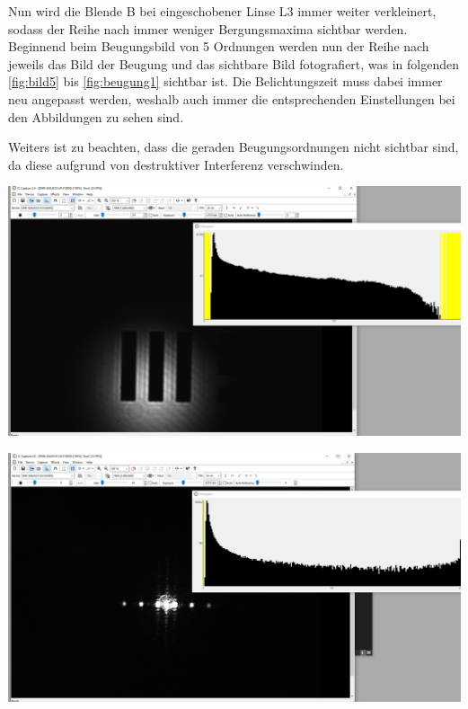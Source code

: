 \documentclass[11pt,ngerman]{scrartcl}
\begin{document}
\noindent Nun wird die Blende B bei eingeschobener Linse L3 immer weiter verkleinert, sodass der Reihe nach immer weniger Bergungsmaxima sichtbar werden.
Beginnend beim Beugungsbild von 5 Ordnungen werden nun der Reihe nach jeweils das Bild der Beugung und das sichtbare Bild fotografiert, was in folgenden \autoref{fig:bild5} bis \autoref{fig:beugung1} sichtbar ist. Die Belichtungszeit muss dabei immer neu angepasst werden, weshalb auch immer die entsprechenden Einstellungen bei den Abbildungen zu sehen sind.

\vspace{2mm}

\noindent Weiters ist zu beachten, dass die geraden Beugungsordnungen nicht sichtbar sind, da diese aufgrund von destruktiver Interferenz verschwinden.

\vspace{4mm}

\begin{minipage}{\textwidth}
	\begin{minipage}[t]{0.5\textwidth}
		\centering
		\includegraphics[width=\textwidth]{abbe/objekt5ordnungen}
		\label{fig:bild5}
	\end{minipage}
	\vspace{2mm}
	\begin{minipage}[t]{0.50\textwidth}
		\centering
		\includegraphics[width=\textwidth]{abbe/beugungsbild5ordnungen}
		\label{fig:beugung5}
	\end{minipage}
	\vspace{1em}
\end{minipage}
\end{document}
